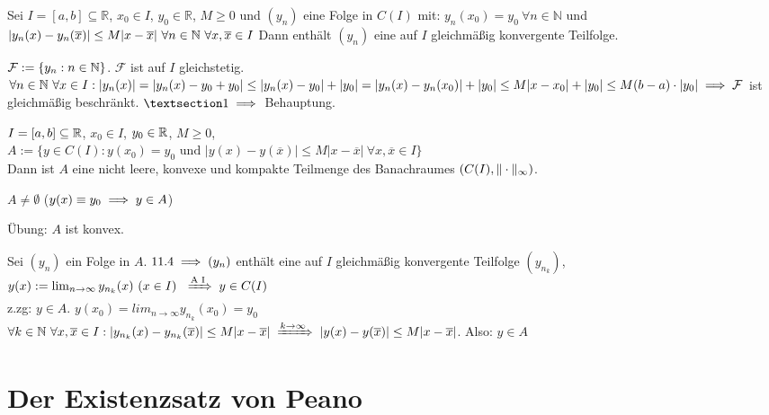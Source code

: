 \documentclass[a4paper,twoside,DIV15,BCOR12mm]{scrbook}
\begin{document}
\begin{satz}
Sei $I=[a,b]\subseteq\mathbb{R}$, $x_0\in I$, $y_0 \in \mathbb{R}$, $M \ge 0$ und $(y_n)$ eine Folge in $C(I)$ mit: $y_n(x_0)=y_0\ \forall n \in \mathbb{N}$ und $ | y_n(x) - y_n(\overline{x}) | \le M | x - \overline{x} |\ \forall n \in \mathbb{N}\ \forall x, \overline{x} \in I$
Dann enthält $(y_n)$ eine auf $I$ gleichmäßig konvergente Teilfolge.
\end{satz}

\begin{beweis}
$\mathcal{F} := \{y_n : n \in \mathbb{N} \}$. $\mathcal{F}$ ist auf $I$ gleichstetig. $\forall n \in \mathbb{N}\ \forall x \in I: |y_n(x)| = |y_n(x)-y_0+y_0| \le | y_n(x)-y_0| + |y_0| = |y_n(x)-y_n(x_0)| + |y_0| \le M |x-x_0| + |y_0| \le M(b-a)\cdot |y_0| \implies \mathcal{F}$ ist gleichmäßig beschränkt. $§1 \folgt$ Behauptung.
\end{beweis}

\begin{satz}
$I=[a,b] \subseteq \mathbb{R}$, $x_0 \in I$, $y_0 \in \mathbb{R}$, $M \ge 0$, \\
$A:=\{y \in C(I): y(x_0)=y_0 \text{ und } |y(x)-y(\overline{x})| \le M|x-\overline{x}|\ \forall x,\overline{x} \in I \}$ \\
Dann ist $A$ eine nicht leere, konvexe und kompakte Teilmenge des Banachraumes \nolinebreak $(C(I) \nolinebreak , \nolinebreak \| \nolinebreak \cdot \nolinebreak \|_\infty)$.
\end{satz}

\begin{beweis}
\item $A \ne \emptyset$ \quad ($y(x) \equiv y_0 \implies y \in A$)
\item Übung: $A$ ist konvex.
\item Sei $(y_n)$ ein Folge in $A$. $11.4 \implies (y_n)$ enthält eine auf $I$ gleichmäßig konvergente Teilfolge $(y_{n_k})$, $y(x):=\lim_{n \to \infty} y_{n_k}(x)\ (x \in I)\ \folgtnach{A I} y \in C(I)$ \\
z.zg: $y \in A$. $y(x_0)=lim_{n \to \infty} y_{n_k}(x_0) = y_0$ \\
$\forall k \in \MdN\ \forall x,\overline{x} \in I: |y_{n_k}(x)-y_{n_k}(\overline{x})| \le M|x-\overline{x}| \folgtwegen{k \to \infty} |y(x)-y(\overline{x})| \le M|x-\overline{x}|$. Also: $y \in A$
\end{beweis}
\chapter{Der Existenzsatz von Peano}
\end{document}
